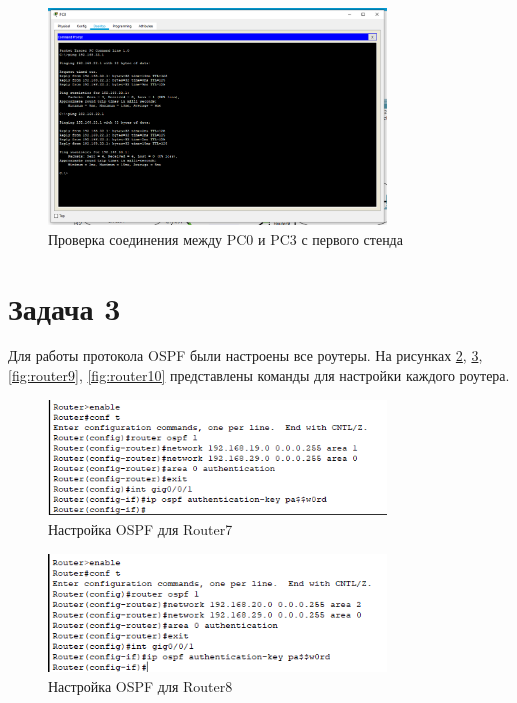\begin{figure}[H]
    \centering
    \includegraphics[width=0.8\textwidth]{img/content/ping_1.png}
    \caption{Проверка соединения между PC0 и PC3 с первого стенда}
    \label{fig:ping_1}
\end{figure}

\section{Задача 3}

Для работы протокола OSPF были настроены все роутеры. На рисунках \ref{fig:router7}, \ref{fig:router8}, \ref{fig:router9}, \ref{fig:router10} представлены команды для настройки каждого роутера.

\begin{figure}[H]
    \centering
    \includegraphics[width=0.8\textwidth]{img/content/router7.png}
    \caption{Настройка OSPF для Router7}
    \label{fig:router7}
\end{figure}

\begin{figure}[H]
    \centering
    \includegraphics[width=0.8\textwidth]{img/content/router8.png}
    \caption{Настройка OSPF для Router8}
    \label{fig:router8}
\end{figure}

